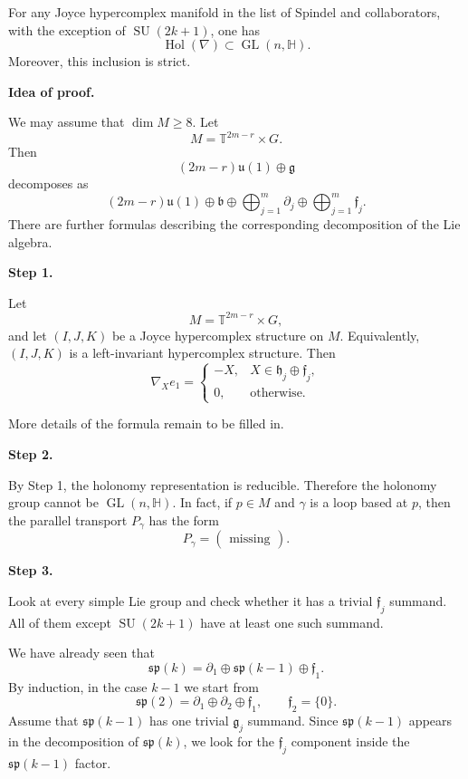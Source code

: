 \begin{theorem}[BFGV]
\label{theorem-any-joyce}
For any Joyce hypercomplex manifold in
the list of Spindel and collaborators,
with the exception of
$\operatorname{SU}(2k+1)$, one has
\[
\operatorname{Hol}(\nabla)
\subset
\operatorname{GL}(n,\mathbb{H}).
\]
Moreover, this inclusion is strict.
\end{theorem}

\medskip\noindent
{\bf Idea of proof.}

We may assume that $\dim M\geq 8$.
Let
\[
M=\mathbb{T}^{2m-r}\times G.
\]
Then
\[
(2m-r)\mathfrak u(1)\oplus\mathfrak g
\]
decomposes as
\[
(2m-r)\mathfrak u(1)
\oplus\mathfrak b
\oplus
\bigoplus_{j=1}^m\partial_j
\oplus
\bigoplus_{j=1}^m\mathfrak f_j.
\]
There are further formulas describing
the corresponding decomposition of
the Lie algebra.

\medskip\noindent
{\bf Step 1.}

\begin{lemma}[BFGV]
\label{lemma-let-m2}
Let
\[
M=\mathbb{T}^{2m-r}\times G,
\]
and let $(I,J,K)$ be a Joyce
hypercomplex structure on $M$.
Equivalently, $(I,J,K)$ is a
left-invariant hypercomplex structure.
Then
\[
\nabla_X e_1
=
\begin{cases}
-X, & X\in\mathfrak h_j\oplus
\mathfrak f_j,\\
0, & \text{otherwise}.
\end{cases}
\]
\end{lemma}

More details of the formula remain to
be filled in.

\medskip\noindent
{\bf Step 2.}

By Step 1, the holonomy representation
is reducible.
Therefore the holonomy group cannot be
$\operatorname{GL}(n,\mathbb{H})$.
In fact, if $p\in M$ and $\gamma$ is
a loop based at $p$, then the parallel
transport $P_\gamma$ has the form
\[
P_\gamma=
\begin{pmatrix}
\text{missing}
\end{pmatrix}.
\]

\medskip\noindent
{\bf Step 3.}

Look at every simple Lie group and
check whether it has a trivial
$\mathfrak f_j$ summand.
All of them except
$\operatorname{SU}(2k+1)$ have at
least one such summand.

We have already seen that
\[
\mathfrak{sp}(k)
=
\partial_1\oplus\mathfrak{sp}(k-1)
\oplus\mathfrak f_1.
\]
By induction, in the case $k-1$ we
start from
\[
\mathfrak{sp}(2)
=
\partial_1\oplus\partial_2
\oplus\mathfrak f_1,
\qquad
\mathfrak f_2=\{0\}.
\]
Assume that $\mathfrak{sp}(k-1)$ has
one trivial $\mathfrak g_j$ summand.
Since $\mathfrak{sp}(k-1)$ appears in
the decomposition of
$\mathfrak{sp}(k)$, we look for the
$\mathfrak f_j$ component inside the
$\mathfrak{sp}(k-1)$ factor.

